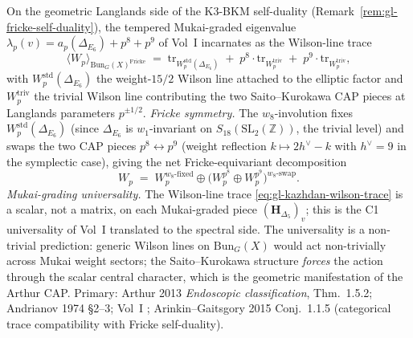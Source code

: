 \begin{remark}
\label{rem:gl-kazhdan-fricke-wilson}
On the geometric Langlands side of the K3-BKM self-duality
(Remark~\ref{rem:gl-fricke-self-duality}), the tempered
Mukai-graded eigenvalue $\lambda_p(v) = a_p(\Delta_{E_6}) + p^8 + p^9$
of Vol~I \cite{VolI}
incarnates as the Wilson-line trace
\begin{equation}
\label{eq:gl-kazhdan-wilson-trace}
 \bigl\langle W_p\bigr\rangle_{\mathrm{Bun}_G(X)^{\mathrm{Fricke}}}
 \;=\;
 \mathrm{tr}_{W_p^{\mathrm{std}}(\Delta_{E_6})}
 \;+\;
 p^8\cdot\mathrm{tr}_{W_p^{\mathrm{triv}}}
 \;+\;
 p^9\cdot\mathrm{tr}_{W_p^{\mathrm{triv}}},
\end{equation}
with $W_p^{\mathrm{std}}(\Delta_{E_6})$ the weight-$15/2$ Wilson line
attached to the elliptic factor and $W_p^{\mathrm{triv}}$ the trivial
Wilson line contributing the two Saito--Kurokawa CAP pieces at Langlands
parameters $p^{\pm 1/2}$. \emph{Fricke symmetry.} The $w_8$-involution
fixes $W_p^{\mathrm{std}}(\Delta_{E_6})$ (since $\Delta_{E_6}$ is
$w_1$-invariant on $S_{18}(\mathrm{SL}_2(\mathbb{Z}))$, the trivial
level) and swaps the two CAP pieces $p^8 \leftrightarrow p^9$ (weight
reflection $k \mapsto 2h^\vee - k$ with $h^\vee = 9$ in the symplectic
case), giving the net Fricke-equivariant decomposition
\[
 W_p\;=\;W_p^{w_8\text{-fixed}}\oplus
 \bigl(W_p^{p^8} \oplus W_p^{p^9}\bigr)^{w_8\text{-swap}}.
\]
\emph{Mukai-grading universality.} The Wilson-line trace
\eqref{eq:gl-kazhdan-wilson-trace} is a scalar, not a matrix, on
each Mukai-graded piece $(\mathbf{H}_{\Delta_5})_v$; this is the
C1 universality of Vol~I
\cite{VolI} translated to
the spectral side. The universality is a non-trivial prediction: generic
Wilson lines on $\mathrm{Bun}_G(X)$ would act non-trivially across Mukai
weight sectors; the Saito--Kurokawa structure \emph{forces} the action
through the scalar central character, which is the geometric
manifestation of the Arthur CAP.
Primary: Arthur 2013 \emph{Endoscopic classification}, Thm.~1.5.2;
Andrianov 1974 \S 2--3; Vol~I
\cite{VolI};
Arinkin--Gaitsgory 2015 Conj.~1.1.5 (categorical trace compatibility
with Fricke self-duality).
\end{remark}

